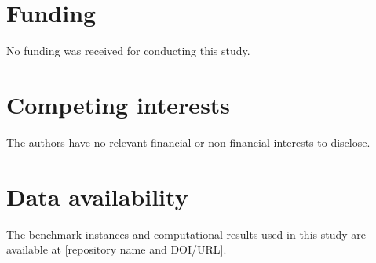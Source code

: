 \documentclass[pdflatex,sn-mathphys-ay]{sn-jnl}
\theoremstyle{thmstyleone}
\theoremstyle{thmstyletwo}
\theoremstyle{thmstylethree}
\begin{document}

\maketitle









\section*{Funding}
No funding was received for conducting this study.

\section*{Competing interests}
The authors have no relevant financial or non-financial interests to disclose.

\section*{Data availability}
The benchmark instances and computational results used in this study are
available at [repository name and DOI/URL].


\end{document}
